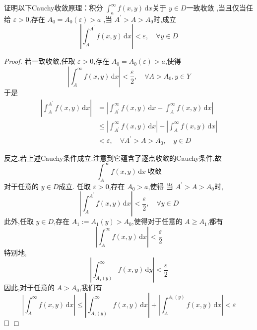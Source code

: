 \documentclass[lang=cn,12pt,color=green,fontset=none,thmcnt=section]{elegantbook}
\begin{document}
\begin{exercise}
    证明以下Cauchy收敛原理：积分 $ \int_{a}^{\infty}f\left( x,y \right)\,\mathrm{d} x  $关于 $ y \in D $一致收敛 ,当且仅当任给 $ \varepsilon >0 $,存在 $ A_0 = A_0\left( \varepsilon  \right)>a  $    ,当 $ A^{\prime} >A>A_0 $时,成立 $$
    \left| \int_{A}^{A^{\prime} } f\left( x,y \right)\,\mathrm{d} x  \right|<\varepsilon ,\quad  \forall y \in D 
    $$ 
\end{exercise}

\begin{proof}
    若一致收敛,任取 $ \varepsilon >0 $,存在 $ A_0=A_0\left( \varepsilon  \right)>a  $,使得 $$
    \left| \int_{A}^{\infty}f\left( x,y \right)\,\mathrm{d} x  \right|< \frac{\varepsilon}{2},\quad \forall A>A_0, y \in Y 
    $$  于是 $$
    \begin{aligned}
        \left| \int_{A}^{A^{\prime} }f\left( x,y \right)\,\mathrm{d} x  \right|& = \left| \int_{A^{\prime} }^{\infty}f\left( x,y \right)\,\mathrm{d} x -\int_{A}^{\infty}f\left( x,y \right)\,\mathrm{d} x  \right|\\ 
         & \le \left| \int_{A^{\prime} }^{\infty}f\left( x,y \right)\,\mathrm{d} x  \right|   + \left| \int_{A}^{\infty}f\left( x,y \right)\,\mathrm{d} x  \right| \\ 
          & < \varepsilon  ,\quad  \forall  A^{\prime} >A>A_0, \quad y \in D
    \end{aligned}
    $$

    反之,若上述Cauchy条件成立.注意到它蕴含了逐点收敛的Cauchy条件,故 $$
    \int_{A}^{\infty} f\left( x,y \right)\,\mathrm{d} x \;\text{收敛}
    $$对于任意的 $ y \in D $成立. 任取 $ \varepsilon >0 $,存在 $ A_0 >a $,使得 当 $ A^{\prime} >A>A_0 $时, $$
    \left| \int_{A}^{A^{\prime} }f\left( x,y \right)\,\mathrm{d} x  \right|<\frac{\varepsilon}{2} ,\quad \forall y \in D 
    $$  此外,任取 $ y \in D $,存在 $ A_1:=A_1\left( y \right) > A_0 $,使得对于任意的 $ A\ge  A_1 $,都有 $$
    \left| \int_{A}^{\infty}f\left( x,y \right)\,\mathrm{d} x  \right|< \frac{\varepsilon}{2} $$特别地, $$
    \left| \int_{A_1\left( y \right) }^{\infty}f\left( x,y \right)\,\mathrm{d} y  \right|< \frac{\varepsilon}{2} 
    $$
    因此,对于任意的 $ A> A_0 $,我们有 $$
    \left| \int_{A}^{\infty}f\left( x,y \right)\,\mathrm{d} x \right| \le  \left| \int_{A_1\left( y \right) }^{\infty}f\left( x,y \right)\,\mathrm{d} x  \right| + \left| \int_{A}^{A_1\left( y \right) }f\left( x,y \right)\,\mathrm{d} x  \right| < \varepsilon  
    $$ 
    $\hfill\square$
\end{proof}
\end{document}
